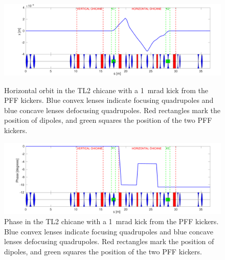 {\begin{landscape}
\begin{figure}
  \centering
  \includegraphics[width=0.75\hsize]{Figures/optics/pffOpticsX}
  \caption{Horizontal orbit in the TL2 chicane with a 1~mrad kick from the PFF kickers. Blue convex lenses indicate focusing quadrupoles and blue concave lenses defocusing quadrupoles. Red rectangles mark the position of dipoles, and green squares the position of the two PFF kickers.}
  \label{f:pffOpticsX}
  \includegraphics[width=0.75\hsize]{Figures/optics/pffOpticsPhase}
  \caption{Phase in the TL2 chicane with a 1~mrad kick from the PFF kickers. Blue convex lenses indicate focusing quadrupoles and blue concave lenses defocusing quadrupoles. Red rectangles mark the position of dipoles, and green squares the position of the two PFF kickers.}
  \label{f:pffOpticsPhase}
\end{figure}
\end{landscape}}